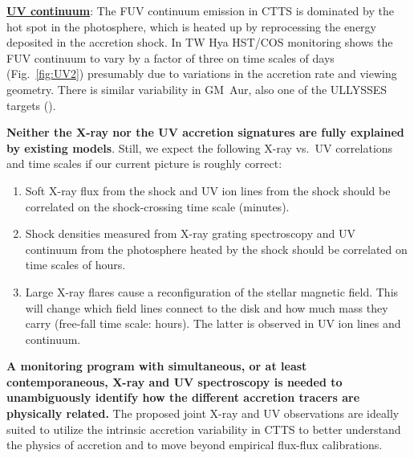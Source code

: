 \documentclass[letterpaper,11pt,twocolumn]{article}
\begin{document}
\underline{\bf UV continuum}: The FUV continuum emission in CTTS is
dominated by the hot spot in the photosphere, which is heated up by
reprocessing the energy deposited in the accretion shock. In
TW Hya HST/COS monitoring shows the FUV
continuum to vary by a factor of three on time scales of days
(Fig.~\ref{fig:UV2}) presumably due to variations in the
accretion rate and viewing geometry. There is similar variability in
GM~Aur, also one of the ULLYSSES targets ().


{\bf Neither the X-ray nor the UV accretion signatures are fully explained by existing models}. Still, we expect the following X-ray vs.\ UV correlations and time scales if our current picture is roughly correct:
\begin{enumerate}
    \itemsep1pt
    \item Soft X-ray flux from the shock and UV ion lines from the shock should be correlated on the shock-crossing time scale (minutes).
    \item Shock densities measured from X-ray grating
      spectroscopy and UV continuum from the
      photosphere heated by the shock should be correlated on time
      scales of hours.
    \item Large X-ray flares cause a reconfiguration of the stellar
      magnetic field. This will change which field lines connect to
      the disk and how much mass they carry (free-fall time scale:
      hours). The latter is observed in UV ion lines and continuum.
\end{enumerate}

\textbf{A monitoring program with simultaneous, or at least contemporaneous, X-ray and UV spectroscopy
is needed to unambiguously identify how the different 
accretion tracers are physically related.} The proposed joint X-ray and UV observations are ideally
suited to utilize the intrinsic accretion variability in
CTTS to better understand the physics of accretion and to move beyond 
empirical flux-flux calibrations. 
\end{document}
